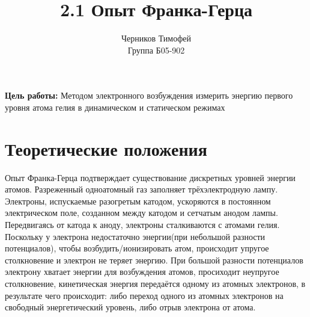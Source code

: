 \documentclass[a4paper]{article}
\author{Черников Тимофей\\
Группа Б05-902}
\title{2.1 Опыт Франка-Герца}
\date{\vspace{-10pt}}
\begin{document}
\maketitle
	\textbf{Цель работы:} Методом электронного возбуждения измерить энергию первого уровня атома гелия в динамическом и статическом режимах

\section{Теоретические положения}
Опыт Франка-Герца подтверждает существование дискретных уровней энергии атомов. 
Разреженный одноатомный газ заполняет трёхэлектродную лампу. 
Электроны, испускаемые разогретым катодом, ускоряются в постоянном электрическом поле, созданном между катодом и сетчатым анодом лампы. 
Передвигаясь от катода к аноду, электроны сталкиваются с атомами гелия. Поскольку у электрона недостаточно энергии(при небольшой разности потенциалов), 
чтобы возбудить/ионизировать атом, происходит упругое столкновение и электрон не теряет энергию. 
При большой разности потенциалов электрону хватает энергии для возбуждения атомов, просиходит неупругое столкновение, 
кинетическая энергия передаётся одному из атомных электронов, в результате чего происходит: либо переход одного из атомных электронов на свободный энергетический уровень,
либо отрыв электрона от атома.
\end{document}
